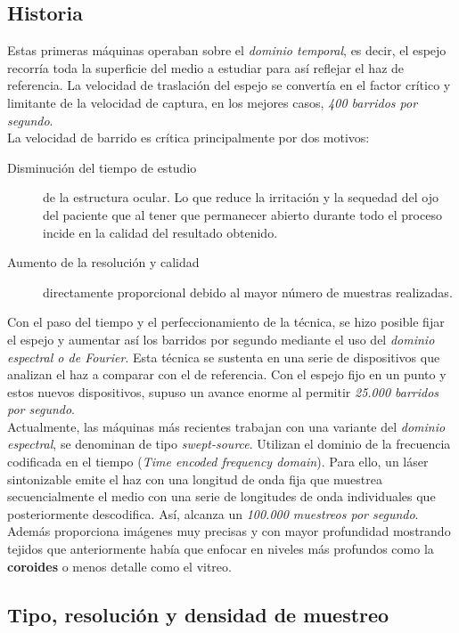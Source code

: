 \subsection{Historia}
Estas primeras máquinas operaban sobre el \emph{dominio temporal}, es decir,
el espejo recorría toda la superficie del medio a estudiar para así
reflejar el haz de referencia. La velocidad de traslación del espejo
se convertía en el factor crítico y limitante de la velocidad de
captura, en los mejores casos, \emph{400 barridos por segundo}.\\
La velocidad de barrido es crítica principalmente por dos motivos:
\begin{description}
\item [Disminución del tiempo de estudio] de la estructura ocular. Lo
  que reduce la irritación y la sequedad del ojo del paciente que al
  tener que permanecer abierto durante todo el proceso incide en la
  calidad del resultado obtenido.
\item [Aumento de la resolución y calidad] directamente proporcional
  debido al mayor número de muestras realizadas.
\end{description}
Con el paso del tiempo y el perfeccionamiento de la técnica, se hizo
posible fijar el espejo y aumentar así los barridos por segundo
mediante el uso del \emph{dominio espectral o de Fourier}. Esta
técnica se sustenta en una serie de dispositivos que analizan el haz a
comparar con el de referencia. Con el espejo fijo en un punto y estos
nuevos dispositivos, supuso un avance enorme al permitir \emph{25.000
  barridos por segundo}.\\
Actualmente, las máquinas más recientes trabajan con una variante del
\emph{dominio espectral}, se denominan de tipo
\emph{swept-source}. Utilizan el dominio de la frecuencia codificada
en el tiempo (\emph{Time encoded frequency domain}). Para ello, un
láser sintonizable emite el haz con una longitud de onda fija que
muestrea secuencialmente el medio con una serie de longitudes de onda
individuales que posteriormente descodifica. Así, alcanza un
\emph{100.000 muestreos por segundo}. Además proporciona imágenes muy
precisas y con mayor profundidad mostrando tejidos que anteriormente
había que enfocar en niveles más profundos como la \textbf{coroides} o
menos detalle como el vitreo.

\subsection{Tipo, resolución y densidad de muestreo}

